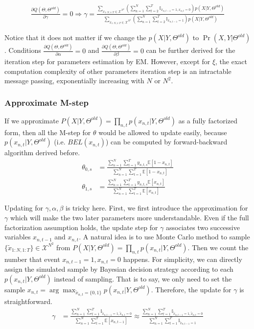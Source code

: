 \documentclass{article} %
\begin{document}
\begin{align*}
\frac{\partial Q(\Theta,\Theta^{old})}{\partial\gamma}=0\Rightarrow \gamma=\frac{\sum_{x_{1:N,1:T}\in\mathcal{X}^{N^2}}\left(\sum_{n=1}^N\sum_{t=2}^T\mathbb{I}_{x_{n,t-1}=1,x_{n,t}=0}\right)p(X|Y,\Theta^{old})}{\sum_{x_{1:N,1:T}\in\mathcal{X}^{N^2}}\left(\sum_{n=1}^N\sum_{t=2}^T\mathbb{I}_{x_{n,t-1}=1}\right)p(X|Y,\Theta^{old})}
\end{align*}

Notice that it does not matter if we change the $p(X|Y,\Theta^{old})$ to $\Pr(X,Y|\Theta^{old})$. Conditions $\frac{\partial Q(\Theta,\Theta^{old})}{\partial\alpha}=0$ and $\frac{\partial Q(\Theta,\Theta^{old})}{\partial\beta}=0$ can be further derived for the iteration step for parameters estimation by EM. However, except for $\xi$, the exact computation complexity of other parameters iteration step is an intractable message passing, exponentially increasing with $N$ or $N^2$. 

\subsubsection{Approximate M-step}
If we approximate $P(X|Y,\Theta^{old})=\prod_{n,t}p(x_{n,t}|Y,\Theta^{old})$ as a fully factorized form, then all the M-step for $\theta$ would be allowed to update easily, because $p(x_{n,t}|Y,\Theta^{old})$ (i.e. $BEL(x_{n,t})$) can be computed by forward-backward algorithm derived before.
\begin{align}
\theta_{0,s}&=\frac{\sum_{n=1}^N\sum_{t=1}^Ty_{n,t,s}\mathbb{E}[1-x_{n,t}]}{\sum_{n=1}^N\sum_{t=1}^T\mathbb{E}[1-x_{n,t}]}\\
\theta_{1,s}&=\frac{\sum_{n=1}^N\sum_{t=1}^Ty_{n,t,s}\mathbb{E}[x_{n,t}]}{\sum_{n=1}^N\sum_{t=1}^T\mathbb{E}[x_{n,t}]}
\end{align}

Updating for $\gamma,\alpha,\beta$ is tricky here. First, we first introduce the approximation for $\gamma$ which will make the two later parameters more understandable. Even if the full factorization assumption holds, the update step for $\gamma$ associates two successive variables $x_{n,t-1}$ and $x_{n,t}$. A natural idea is to use Monte Carlo method to sample $\{\tilde{x}_{1:N,1:T}\}\in \mathcal{X}^{N^2}$ from $P(X|Y,\Theta^{old})=\prod_{n,t}p(x_{n,t}|Y,\Theta^{old})$. Then we count the number that event $x_{n,t-1}=1,x_{n,t}=0$ happens. For simplicity, we can directly assign the simulated sample by Bayesian decision strategy according to each $p(x_{n,t}|Y,\Theta^{old})$ instead of sampling. That is to say, we only need to set the sample $x_{n,t}=\arg\max_{\tilde{x}_{n,t}=\{0,1\}}p(x_{n,t}|Y,\Theta^{old})$. Therefore, the update for $\gamma$ is straightforward.
\begin{align}
\gamma&=\frac{\sum_{n=1}^N\sum_{t=1}^{T}\mathbb{I}_{\tilde{x}_{n,t-1}=1,\tilde{x}_{n,t}=0}}{\sum_{n=1}^N\sum_{t=1}^{T}\mathbb{E}[x_{n,t-1}]}\approx\frac{\sum_{n=1}^N\sum_{t=1}^{T}\mathbb{I}_{\tilde{x}_{n,t-1}=1,\tilde{x}_{n,t}=0}}{\sum_{n=1}^N\sum_{t=1}^{T}\mathbb{I}_{\tilde{x}_{n,t-1}=1}}
\end{align}
\end{document}
